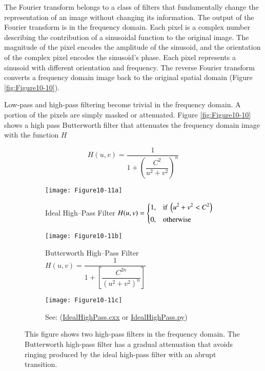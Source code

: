 The Fourier transform belongs to a class of filters that fundamentally change the representation of an image without changing its information. The output of the Fourier transform is in the frequency domain. Each pixel is a complex number describing the contribution of a sinusoidal function to the original image. The magnitude of the pixel encodes the amplitude of the sinusoid, and the orientation of the complex pixel encodes the sinusoid's phase. Each pixel represents a sinusoid with different orientation and frequency. The reverse Fourier transform converts a frequency domain image back to the original spatial domain (Figure \ref{fig:Figure10-10}).

Low-pass and high-pass filtering become trivial in the frequency domain. A portion of the pixels are simply masked or attenuated. Figure \ref{fig:Figure10-10} shows a high pass Butterworth filter that attenuates the frequency domain image with the function $H$

\begin{equation}\label{eq:10.2}
H(u, v) = \dfrac{1}{1 + \left(\dfrac{C^2}{u^2 + v^2}\right)^n}
\end{equation}

\begin{figure}[htb]
    \begin{subfigure}[h]{0.48\linewidth}
        \texttt{[image: Figure10-11a]}
        \captionsetup{justification=centering}
        \caption*{Ideal High--Pass Filter $H(u,v) = \begin{dcases}
        1, & \text{if } \left( u^2 + v^2 < C^2 \right) \\
        0, & \text{otherwise}
        \end{dcases}$}
        \label{fig:Figure10-11a}
    \end{subfigure}
    \hfill
    \begin{subfigure}[h]{0.48\linewidth}
        \texttt{[image: Figure10-11b]}
        \captionsetup{justification=centering}
        \caption*{Butterworth High--Pass Filter
        $H(u,v) = \dfrac{1} {1 + \left[ \dfrac{C^{2n}}{\left( u^2 + v ^2\right)^n} \right]} $}
        \label{fig:Figure10-11b}
    \end{subfigure}
    \hfill
    \begin{subfigure}[h]{0.96\linewidth}
        \texttt{[image: Figure10-11c]}
        \captionsetup{justification=centering}
        \caption*{See: (\href{https://lorensen.github.io/VTKExamples/site/Cxx/ImageProcessing/IdealHighPass/}{IdealHighPass.cxx} or \href{https://lorensen.github.io/VTKExamples/site/Python/ImageProcessing/IdealHighPass/}{IdealHighPass.py})}
        \label{fig:Figure10-11c}
    \end{subfigure}
    \caption{This figure shows two high-pass filters in the frequency domain. The Butterworth high-pass filter has a gradual attenuation that avoids ringing produced by the ideal high-pass filter with an abrupt transition.}\label{fig:Figure10-11}
\end{figure}

